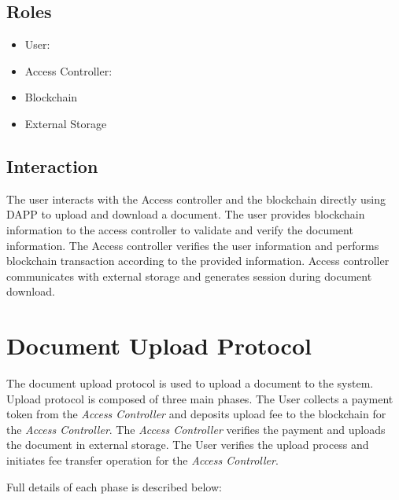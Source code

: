 \documentclass[letterpaper, 10 pt, conference]{ieeeconf}  %
\begin{document}
\subsection{Roles}

\begin{itemize}

\item User: 
\item Access Controller:
\item Blockchain
\item External Storage

\end{itemize}


\subsection{Interaction}

The user interacts with the Access controller and the blockchain directly using DAPP to upload and download a document. The user provides blockchain information to the access controller to validate and verify the document information. The Access controller verifies the user information and performs blockchain transaction according to the provided information. Access controller communicates with external storage and generates session during document download.


%
%

\section{Document Upload Protocol}

The document upload protocol is used to upload a document to the system. Upload protocol is composed of three main phases. The User collects a payment token from the {\it Access Controller} and deposits upload fee to the blockchain for the {\it Access Controller}. The {\it Access Controller} verifies the payment and uploads the document in external storage. The User verifies the upload process and initiates fee transfer operation for the {\it Access Controller}.

Full details of each phase is described below:
\end{document}
